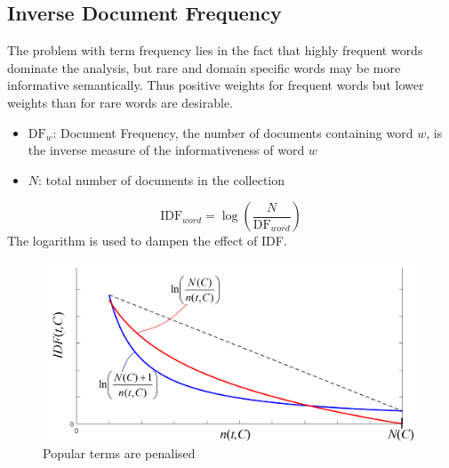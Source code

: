\documentclass[11pt]{article}
\begin{document}
\subsection{Inverse Document Frequency}
The problem with term frequency lies in the fact that highly frequent words dominate the analysis, but rare and domain specific words may be more informative semantically. Thus positive weights for frequent words but lower weights than for rare words are desirable.
\begin{itemize}[label=]
	\item $\text{DF}_w$: Document Frequency, the number of documents containing word $w$, is the inverse measure of the informativeness of word $w$
	\item $N$: total number of documents in the collection
\end{itemize}
\begin{equation*}
	\text{IDF}_{word}=\log\left(\frac{N}{\text{DF}_{word}}\right)
\end{equation*}
The logarithm is used to dampen the effect of IDF.
\begin{figure}[H]
	\centering
	\includegraphics[width=0.6\linewidth]{img/popular_terms_penalty}
	\caption{Popular terms are penalised}
	\label{fig:populartermspenalty}
\end{figure}
\end{document}
